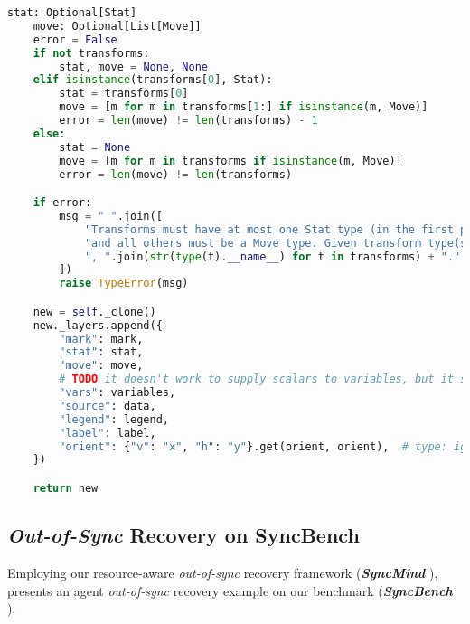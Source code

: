 \begin{lstlisting}[language=Python]
    stat: Optional[Stat]
    move: Optional[List[Move]]
    error = False
    if not transforms:
        stat, move = None, None
    elif isinstance(transforms[0], Stat):
        stat = transforms[0]
        move = [m for m in transforms[1:] if isinstance(m, Move)]
        error = len(move) != len(transforms) - 1
    else:
        stat = None
        move = [m for m in transforms if isinstance(m, Move)]
        error = len(move) != len(transforms)

    if error:
        msg = " ".join([
            "Transforms must have at most one Stat type (in the first position),",
            "and all others must be a Move type. Given transform type(s):",
            ", ".join(str(type(t).__name__) for t in transforms) + "."
        ])
        raise TypeError(msg)

    new = self._clone()
    new._layers.append({
        "mark": mark,
        "stat": stat,
        "move": move,
        # TODO it doesn't work to supply scalars to variables, but it should
        "vars": variables,
        "source": data,
        "legend": legend,
        "label": label,
        "orient": {"v": "x", "h": "y"}.get(orient, orient),  # type: ignore
    })

    return new
\end{lstlisting}






\subsection{\textit{Out-of-Sync} Recovery on SyncBench}
\label{Appendix: Benchmark Construction}


Employing our resource-aware \textit{out-of-sync} recovery framework (\textbf{\textit{SyncMind}} ),  presents an agent \textit{out-of-sync} recovery example on our benchmark (\textbf{\textit{SyncBench}} ). 



